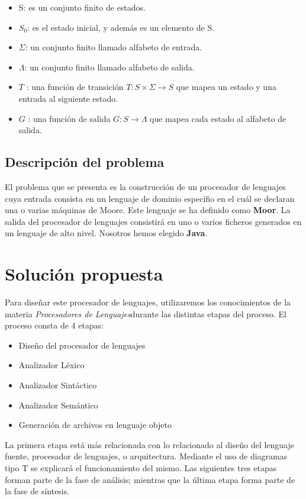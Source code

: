 \documentclass[12pt,a4paper]{article}
\begin{document}
	\begin{itemize}
		\item S: es un conjunto finito de estados.
		\item $S_{0}$: es el estado inicial, y además es un elemento de S.
		\item $\Sigma$: un conjunto finito llamado alfabeto de entrada.
		\item $\Lambda$: un conjunto finito llamado alfabeto de salida.
		\item $T$ : una función de transición $T: S \times \Sigma \rightarrow S$ que mapea un estado y una entrada al siguiente estado.
		\item $G$ : una función de salida $G : S \rightarrow \Lambda $ que mapea cada estado al alfabeto de salida.
	\end{itemize}
\clearpage

\newpage

\subsection{Descripción del problema}
El problema que se presenta es la construcción de un procesador de lenguajes cuya entrada consista en un lenguaje de dominio específio en el cuál se declaran una o varias máquinas de Moore. Este lenguaje se ha definido como \textbf{Moor}. La salida del procesador de lenguajes consistirá en uno o varios ficheros generados en un lenguaje de alto nivel. Nosotros hemos elegido \textbf{Java}.

\section{Solución propuesta}
Para diseñar este procesador de lenguajes, utilizaremos los conocimientos de la materia \textit{Procesadores de Lenguajes}durante las distintas etapas del proceso. El proceso consta de 4  etapas:

\begin{itemize}
	\item Diseño del procesador de lenguajes
	\item Analizador Léxico
	\item Analizador Sintáctico
	\item Analizador Semántico
	\item Generación de archivos en lenguaje objeto
\end{itemize}

La primera etapa está más relacionada con lo relacionado al diseño del lenguaje fuente, procesador de lenguajes, o arquitectura. Mediante el uso de diagramas tipo T se explicará el funcionamiento del mismo. Las siguientes tres etapas forman parte de la fase de análisis; mientras que la última etapa forma parte de la fase de síntesis.
\end{document}
